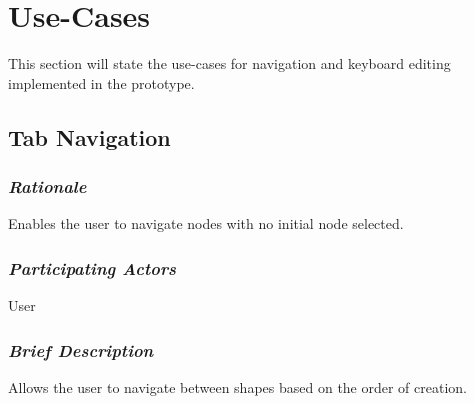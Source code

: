\section{Use-Cases}
This section will state the use-cases for navigation and keyboard editing implemented in the prototype.
\subsection{Tab Navigation}

\subsubsection {\em Rationale}
\par \noindent
Enables the user to navigate nodes with no initial node selected.

\subsubsection {\em Participating Actors}
User

\subsubsection {\em Brief Description}
Allows the user to navigate between shapes based on the order of creation.


